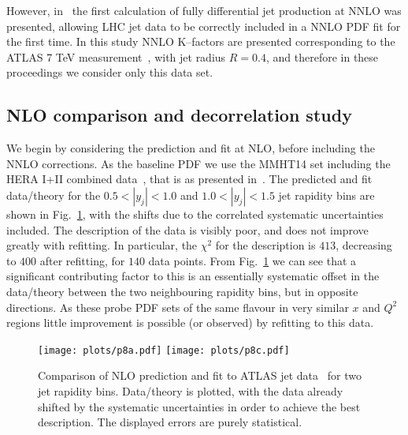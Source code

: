 \documentclass{appolb}
\begin{document}
However, in~\cite{Currie:2016bfm} the first calculation of fully differential jet production at NNLO was presented, allowing LHC jet data to be correctly included in a NNLO PDF fit for the first time. In this study NNLO K--factors are presented corresponding to the ATLAS 7 TeV measurement~\cite{Aad:2014vwa}, with jet radius $R=0.4$, and therefore in these proceedings we consider only this data set.

\subsection{NLO comparison and decorrelation study}

We begin by considering the prediction and fit at NLO, before including the NNLO corrections. As the baseline PDF we use the MMHT14 set including the HERA I+II combined data~\cite{Abramowicz:2015mha}, that is as presented in~\cite{Harland-Lang:2016yfn}. The predicted and fit data/theory for the $0.5<|y_j|<1.0$ and $1.0<|y_j|<1.5$ jet rapidity bins are shown in Fig.~\ref{fig:jet1}, with the shifts due to the correlated systematic uncertainties included. The description of the data is visibly poor, and does not improve greatly with refitting. In particular, the $\chi^2$ for the description is $413$, decreasing to $400$ after refitting, for $140$ data points. From Fig.~\ref{fig:jet1} we can see that a significant contributing factor to this is an essentially systematic offset in the data/theory between the two neighbouring rapidity bins, but in opposite directions. As these probe PDF sets of the same flavour in very similar $x$ and $Q^2$ regions little improvement is possible (or observed) by refitting to this data. 

\begin{figure}[htb]
\centerline{%
\texttt{[image: plots/p8a.pdf]}
\texttt{[image: plots/p8c.pdf]}}
\caption{Comparison of NLO prediction and fit to ATLAS jet data~\cite{Aad:2014vwa} for two jet rapidity bins. Data/theory is plotted, with the data already shifted by the systematic uncertainties in order to achieve the best description. The displayed errors are purely statistical.}
\label{fig:jet1}
\end{figure}
\end{document}
